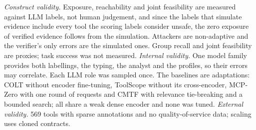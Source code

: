 \emph{Construct validity.} Exposure, reachability and joint feasibility are measured against LLM labels, not human
judgement, and since the labels that simulate evidence include every tool the scoring labels consider unsafe,
the zero exposure of verified evidence follows from the simulation. Attackers are non-adaptive and the verifier's
only errors are the simulated ones. Group recall and joint feasibility are proxies; task success was not measured.
\emph{Internal validity.} One model family provides both labellings, the typing, the analyst and the profiles, so
their errors may correlate. Each LLM role was sampled once. The baselines are adaptations: COLT without encoder
fine-tuning, ToolScope without its cross-encoder, MCP-Zero with one round of requests and CMTF with relevance
tie-breaking and a bounded search; all share a weak dense encoder and none was tuned. \emph{External validity.}
569 tools with sparse annotations and no quality-of-service data; scaling uses cloned contracts.
